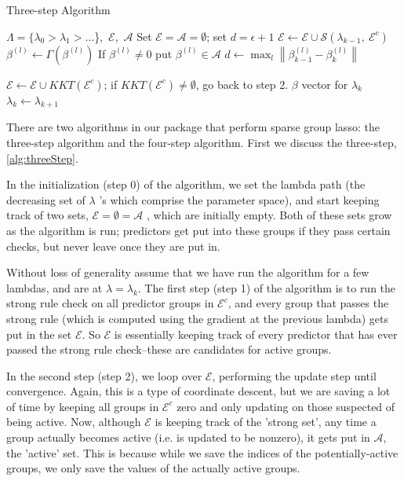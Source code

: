 \documentclass[titlepage]{article}
\newcommand{\norm}[1]{\left\lVert #1 \right\rVert}
\begin{document}
\begin{algorithm}
  \caption{Three-step Algorithm\label{alg:threeStep}}
  \begin{algorithmic}
     $\Lambda = \{\lambda_0>\lambda_1> \dots$\},\ $\mathcal{E}$,\ $\mathcal{A}$
    \STATE Set $\mathcal{E}=\mathcal{A}=\emptyset$; set $d=\epsilon+1$
     $\mathcal{E} \leftarrow  \mathcal{E}\cup \mathcal{S}(\lambda_{k-1},\ \mathcal{E}^c)$
    \STATE  $\beta^{(l)} \leftarrow \Gamma (\beta^{(l)})$
    \STATE If $\beta^{(l)} \neq 0$ put $\beta^{(l)} \in \mathcal{A}$	
	\ENDFOR
	\STATE $d \leftarrow \max_{l} \norm{\beta^{(l)}_{k-1}-\beta^{(l)}_{k}}$ 
	\ENDWHILE    
    
     $\mathcal{E} \leftarrow  \mathcal{E}\cup KKT(\mathcal{E}^c)$; if $KKT(\mathcal{E}^c) \neq \emptyset$, go back to step 2.  
    \RETURN $\beta$ vector for $\lambda_k$
    \STATE $\lambda_k \leftarrow \lambda_{k+1}$
  \end{algorithmic}
\end{algorithm}


There are two algorithms in our package that perform sparse group lasso: the three-step algorithm and the four-step algorithm. First we discuss the three-step, \autoref{alg:threeStep}.

In the initialization (step 0) of the algorithm, we set the lambda path (the decreasing set of $\lambda$ 's which comprise the parameter space), and start keeping track of two sets, $\mathcal{E} = \emptyset = \mathcal{A}$ , which are initially empty. Both of these sets grow as the algorithm is run; predictors get put into these groups if they pass certain checks, but never leave once they are put in.

Without loss of generality assume that we have run the algorithm for a few lambdas, and are at $\lambda = \lambda_{k}$. The first step (step 1) of the algorithm is to run the strong rule check on all predictor groups in $\mathcal{E}^c$, and every group that passes the strong rule (which is computed using the gradient at the previous lambda) gets put in the set $\mathcal{E}$. So $\mathcal{E}$ is essentially keeping track of every predictor that has ever passed the strong rule check--these are candidates for active groups.

In the second step (step 2), we loop over $\mathcal{E}$, performing the update step until convergence. Again, this is a type of coordinate descent, but we are saving a lot of time by keeping all groups in $\mathcal{E}^c$ zero and only updating on those suspected of being active. Now, although $\mathcal{E}$ is keeping track of the 'strong set', any time a group actually becomes active (i.e. is updated to be nonzero), it gets put in $\mathcal{A}$, the 'active' set. This is because while we save the indices of the potentially-active groups, we only save the values of the actually active groups.
\end{document}
